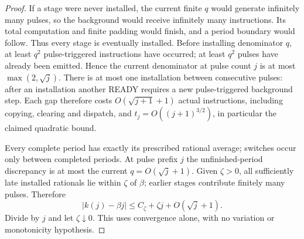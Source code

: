 \begin{proof}
If a stage were never installed, the current finite $q$ would generate infinitely many pulses, so the background would receive infinitely many instructions. Its total computation and finite padding would finish, and a period boundary would follow. Thus every stage is eventually installed.
Before installing denominator $q$, at least $q^2$ pulse-triggered instructions have occurred; at least $q^2$ pulses have already been emitted. Hence the current denominator at pulse count $j$ is at most $\max(2,\sqrt j)$. There is at most one installation between consecutive pulses: after an installation another READY requires a new pulse-triggered background step. Each gap therefore costs $O(\sqrt{j+1}+1)$ actual instructions, including copying, clearing and dispatch, and $t_j=O((j+1)^{3/2})$, in particular the claimed quadratic bound.

Every complete period has exactly its prescribed rational average; switches occur only between completed periods. At pulse prefix $j$ the unfinished-period discrepancy is at most the current $q=O(\sqrt j+1)$. Given $\zeta>0$, all sufficiently late installed rationals lie within $\zeta$ of $\beta$; earlier stages contribute finitely many pulses. Therefore
\[
 |k(j)-\beta j|\le C_\zeta+\zeta j+O(\sqrt j+1).
\]
Divide by $j$ and let $\zeta\downarrow0$. This uses convergence alone, with no variation or monotonicity hypothesis.
\end{proof}

